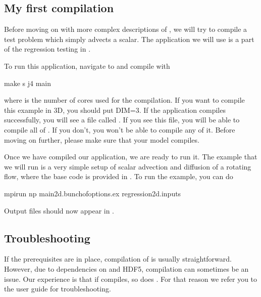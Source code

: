 \documentclass[letterpaper,10pt,english]{sphinxmanual}
\begin{document}
\subsection{My first compilation}
\label{\detokenize{GettingStarted:my-first-compilation}}\label{\detokenize{GettingStarted:chap-myfirstcompilation}}
Before moving on with more complex descriptions of , we will try to compile a test problem which simply advects a scalar.
The application we will use is a part of the regression testing in .

To run this application, navigate to  and compile with

\begin{sphinxVerbatim}[commandchars=\\\{\},formatcom=\scriptsize]
make \PYGZhy{}s \PYGZhy{}j4  main
\end{sphinxVerbatim}

where  is the number of cores used for the compilation. If you want to compile this example in 3D, you should put DIM=3.
If the application compiles successfully, you will see a file called .
If you see this file, you will be able to compile all of . If you don’t, you won’t be able to compile any of it.
Before moving on further, please make sure that your model compiles.

Once we have compiled our application, we are ready to run it.
The example that we will run is a very simple setup of scalar advection and diffusion of a rotating flow, where the base code is provided in .
To run the example, you can do

\begin{sphinxVerbatim}[commandchars=\\\{\},formatcom=\scriptsize]
mpirun \PYGZhy{}np  main2d.\PYGZlt{}bunch\PYGZus{}of\PYGZus{}options\PYGZgt{}.ex regression2d.inputs
\end{sphinxVerbatim}

Output files should now appear in .


\subsection{Troubleshooting}
\label{\detokenize{GettingStarted:troubleshooting}}
If the prerequisites are in place, compilation of  is usually straightforward.
However, due to dependencies on  and HDF5, compilation can sometimes be an issue.
Our experience is that if  compiles, so does .
For that reason we refer you to the  user guide for troubleshooting.
\end{document}
